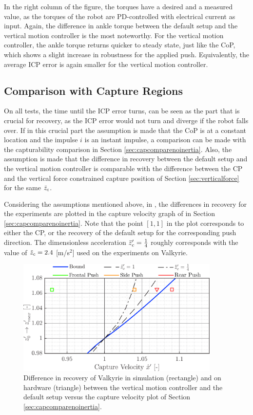 In the right column of the figure, the torques have a desired and a measured value, as the torques of the robot are PD-controlled with electrical current as input. Again, the difference in ankle torque between the default setup and the vertical motion controller is the most noteworthy. For the vertical motion controller, the ankle torque returns quicker to steady state, just like the \ac{CoP}, which shows a slight increase in robustness for the applied push. Equivalently, the average \ac{ICP} error is again smaller for the vertical motion controller.

\subsection{Comparison with Capture Regions}
On all tests, the time until the \ac{ICP} error turns, can be seen as the part that is crucial for recovery, as the \ac{ICP} error would not turn and diverge if the robot falls over. If in this crucial part the assumption is made that the \ac{CoP} is at a constant location and the impulse $i$ is an instant impulse, a comparison can be made with the capturability comparison in Section \ref{sec:capcomparenoinertia}. Also, the assumption is made that the difference in recovery between the default setup and the vertical motion controller is comparable with the difference between the \ac{CP} and the vertical force constrained capture position of Section \ref{sec:verticalforce} for the same $\ddot{z}_{c}$.

Considering the assumptions mentioned above, in , the differences in recovery for the experiments are plotted in the capture velocity graph of  in Section \ref{sec:capcomparenoinertia}. Note that the point $[1,1]$ in the plot corresponds to either the \ac{CP}, or the recovery of the default setup for the corresponding push direction. The dimensionless acceleration $\ddot{z}_{c}'=\frac{1}{4}$ roughly corresponds with the value of $\ddot{z}_{c}=2.4$ [m/s$^2$] used on the experiments on Valkyrie. 
\begin{figure}
\centering
\includegraphics[width=0.9\textwidth]{STYLESTUFF/regioncomparison.png}
\caption{Difference in recovery of Valkyrie in simulation (rectangle) and on hardware (triangle) between the vertical motion controller and the default setup versus the capture velocity plot of Section \ref{sec:capcomparenoinertia}.}
\label{fig:regioncomparison}
\end{figure}

